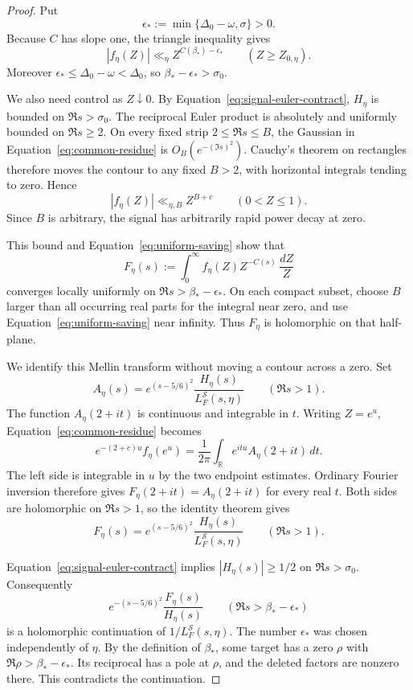 \begin{proof}
Put
\[
 \epsilon_*:=\min\{\Delta_0-\omega,\sigma\}>0.
\]
Because $C$ has slope one, the triangle inequality gives
\begin{equation}
 |f_\eta(Z)|\ll_\eta Z^{C(\beta_*)-\epsilon_*}
 \qquad (Z\ge Z_{0,\eta}).
 \label{eq:uniform-saving}
\end{equation}
Moreover $\epsilon_*\le\Delta_0-\omega<\Delta_0$, so
$\beta_*-\epsilon_*>\sigma_0$.

We also need control as $Z\downarrow0$. By
Equation~\eqref{eq:signal-euler-contract}, $H_\eta$ is bounded on
$\Re s>\sigma_0$. The reciprocal Euler product is absolutely and uniformly
bounded on $\Re s\ge2$. On every fixed strip $2\le\Re s\le B$, the Gaussian
in Equation~\eqref{eq:common-residue} is $O_B(e^{-(\Im s)^2})$. Cauchy's
theorem on rectangles therefore moves the contour to any fixed $B>2$, with
horizontal integrals tending to zero. Hence
\[
 |f_\eta(Z)|\ll_{\eta,B}Z^{B+c}\qquad(0<Z\le1).
\]
Since $B$ is arbitrary, the signal has arbitrarily rapid power decay at zero.

This bound and Equation~\eqref{eq:uniform-saving} show that
\[
 F_\eta(s):=\int_0^\infty f_\eta(Z)Z^{-C(s)}\,\frac{dZ}{Z}
\]
converges locally uniformly on $\Re s>\beta_*-\epsilon_*$. On each compact
subset, choose $B$ larger than all occurring real parts for the integral near
zero, and use Equation~\eqref{eq:uniform-saving} near infinity. Thus $F_\eta$
is holomorphic on that half-plane.

We identify this Mellin transform without moving a contour across a zero.
Set
\[
 A_\eta(s)=e^{(s-5/6)^2}
             \frac{H_\eta(s)}{L_F^{\mathcal S}(s,\eta)}
 \qquad(\Re s>1).
\]
The function $A_\eta(2+it)$ is continuous and integrable in $t$. Writing
$Z=e^u$, Equation~\eqref{eq:common-residue} becomes
\[
 e^{-(2+c)u}f_\eta(e^u)
   =\frac1{2\pi}\int_{\mathbb R}e^{itu}A_\eta(2+it)\,dt.
\]
The left side is integrable in $u$ by the two endpoint estimates. Ordinary
Fourier inversion therefore gives $F_\eta(2+it)=A_\eta(2+it)$ for every real
$t$. Both sides are holomorphic on $\Re s>1$, so the identity theorem gives
\[
 F_\eta(s)=e^{(s-5/6)^2}
             \frac{H_\eta(s)}{L_F^{\mathcal S}(s,\eta)}
 \qquad(\Re s>1).
\]

Equation~\eqref{eq:signal-euler-contract} implies $|H_\eta(s)|\ge1/2$ on
$\Re s>\sigma_0$. Consequently
\[
 e^{-(s-5/6)^2}\frac{F_\eta(s)}{H_\eta(s)}
 \qquad(\Re s>\beta_*-\epsilon_*)
\]
is a holomorphic continuation of $1/L_F^{\mathcal S}(s,\eta)$.
The number $\epsilon_*$ was chosen independently of $\eta$. By the definition
of $\beta_*$, some target has a zero $\rho$ with
$\Re\rho>\beta_*-\epsilon_*$. Its reciprocal has a pole at $\rho$, and the
deleted factors are nonzero there. This contradicts the continuation.
\end{proof}

